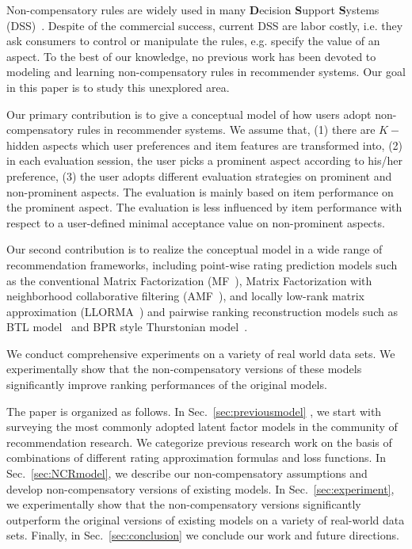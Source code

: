 \documentclass[letterpaper]{article} %
\begin{document}
Non-compensatory rules are widely used in many \textbf{D}ecision \textbf{S}upport \textbf{S}ystems (DSS)~\cite{Lee2009Transforming}. Despite of the commercial success, current DSS are labor costly, i.e. they ask consumers to control or manipulate the rules, e.g. specify the value of an aspect. To the best of our knowledge, no previous work has been devoted to modeling and learning non-compensatory rules in recommender systems. Our goal in this paper is to study this unexplored area. 

Our primary contribution is to give a conceptual model of how users adopt non-compensatory rules in recommender systems. We assume that, (1) there are $K-$ hidden aspects which  user preferences and item features are transformed into, (2) in each evaluation session, the user picks a prominent aspect according to his/her preference, (3) the user adopts different evaluation strategies on prominent and non-prominent aspects. The evaluation is mainly based on item performance on the prominent aspect. The evaluation is less influenced by item performance with respect to a user-defined minimal acceptance value on non-prominent aspects.

Our second contribution is to realize the conceptual model in a wide range of recommendation frameworks, including point-wise rating prediction models such as the conventional Matrix Factorization (MF~\cite{Koren2009Matrix}), Matrix Factorization with neighborhood collaborative filtering (AMF~\cite{Koren2008Factorization}), and locally low-rank matrix approximation (LLORMA~\cite{Lee2013Local}) and pairwise ranking reconstruction models such as BTL model~\cite{Hu2016Improved} and BPR style  Thurstonian model~\cite{Rendle2009BPR}. 

We conduct comprehensive experiments on a variety of real world data sets. We experimentally show that the non-compensatory versions of these models significantly improve ranking performances of the original models. 

The paper is organized as follows. In Sec.~\ref{sec:previousmodel} , we start with surveying the most commonly adopted latent factor models in the community of recommendation research. We categorize previous research work on the basis of  combinations of  different rating approximation formulas and  loss functions. In Sec.~\ref{sec:NCRmodel}, we describe our non-compensatory assumptions and develop non-compensatory versions of existing models. In Sec.~\ref{sec:experiment}, we experimentally show that the non-compensatory versions significantly outperform the original versions of existing models on a variety of real-world data sets. Finally, in Sec.~\ref{sec:conclusion} we conclude our work and future directions.
\end{document}
